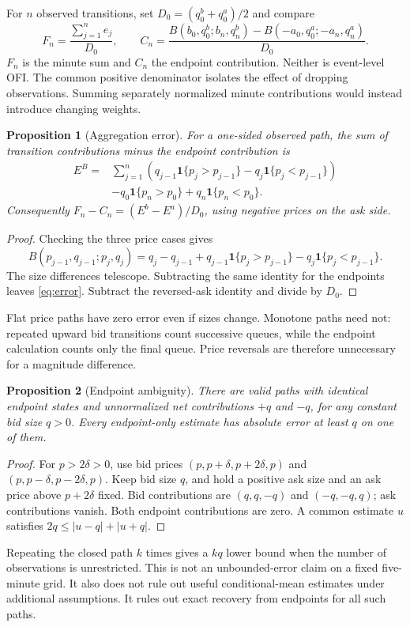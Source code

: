 \documentclass[11pt]{article}
\newcommand{\ind}{\mathbf{1}}
\newtheorem{proposition}{Proposition}
\begin{document}
For $n$ observed transitions, set $D_0=(q^b_0+q^a_0)/2$ and compare
\begin{equation}
 F_n=\frac{\sum_{j=1}^{n}e_j}{D_0},\qquad
 C_n=\frac{B(b_0,q^b_0;b_n,q^b_n)-B(-a_0,q^a_0;-a_n,q^a_n)}{D_0}.
 \label{eq:FC}
\end{equation}
$F_n$ is the minute sum and $C_n$ the endpoint contribution. Neither is event-level OFI. The common positive denominator isolates the effect of dropping observations. Summing separately normalized minute contributions would instead introduce changing weights.

\begin{proposition}[Aggregation error]
For a one-sided observed path, the sum of transition contributions minus the endpoint contribution is
\begin{align}
 E^B={}&\sum_{j=1}^{n}\left(q_{j-1}\ind\{p_j>p_{j-1}\}-q_j\ind\{p_j<p_{j-1}\}\right)\nonumber\\
 &-q_0\ind\{p_n>p_0\}+q_n\ind\{p_n<p_0\}.
 \label{eq:error}
\end{align}
Consequently $F_n-C_n=(E^b-E^a)/D_0$, using negative prices on the ask side.
\end{proposition}
\begin{proof}
Checking the three price cases gives
\[
 B(p_{j-1},q_{j-1};p_j,q_j)
 =q_j-q_{j-1}+q_{j-1}\ind\{p_j>p_{j-1}\}-q_j\ind\{p_j<p_{j-1}\}.
\]
The size differences telescope. Subtracting the same identity for the endpoints leaves \eqref{eq:error}. Subtract the reversed-ask identity and divide by $D_0$.
\end{proof}
Flat price paths have zero error even if sizes change. Monotone paths need not: repeated upward bid transitions count successive queues, while the endpoint calculation counts only the final queue. Price reversals are therefore unnecessary for a magnitude difference.

\begin{proposition}[Endpoint ambiguity]
There are valid paths with identical endpoint states and unnormalized net contributions $+q$ and $-q$, for any constant bid size $q>0$. Every endpoint-only estimate has absolute error at least $q$ on one of them.
\end{proposition}
\begin{proof}
For $p>2\delta>0$, use bid prices $(p,p+\delta,p+2\delta,p)$ and $(p,p-\delta,p-2\delta,p)$. Keep bid size $q$, and hold a positive ask size and an ask price above $p+2\delta$ fixed. Bid contributions are $(q,q,-q)$ and $(-q,-q,q)$; ask contributions vanish. Both endpoint contributions are zero. A common estimate $u$ satisfies $2q\leq |u-q|+|u+q|$.
\end{proof}
Repeating the closed path $k$ times gives a $kq$ lower bound when the number of observations is unrestricted. This is not an unbounded-error claim on a fixed five-minute grid. It also does not rule out useful conditional-mean estimates under additional assumptions. It rules out exact recovery from endpoints for all such paths.
\end{document}
